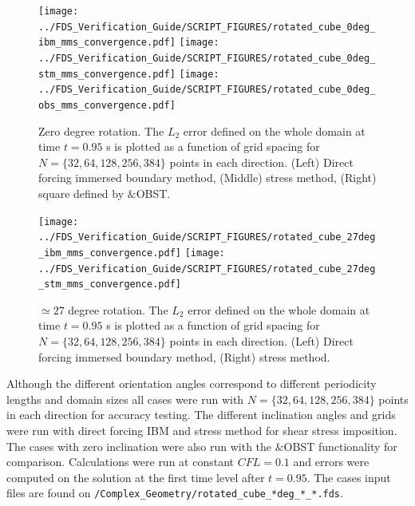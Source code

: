 \documentclass[11pt]{book}
\begin{document}
\begin{figure}[ht]
\centering
\texttt{[image: ../FDS\_Verification\_Guide/SCRIPT\_FIGURES/rotated\_cube\_0deg\_ibm\_mms\_convergence.pdf]}
\texttt{[image: ../FDS\_Verification\_Guide/SCRIPT\_FIGURES/rotated\_cube\_0deg\_stm\_mms\_convergence.pdf]}
\texttt{[image: ../FDS\_Verification\_Guide/SCRIPT\_FIGURES/rotated\_cube\_0deg\_obs\_mms\_convergence.pdf]}
\caption[The {\ct Rotated Cube CC} accuracy order test case]{Zero degree rotation. The $L_2$ error defined on the whole domain at time $t = 0.95$ s is plotted as a function of grid spacing for $N=\{32,64,128,256,384\}$ points in each direction. (Left) Direct forcing immersed boundary method, (Middle) stress method, (Right) square defined by $\&$OBST.}\label{fig:rotcube_cc_0deg_accuracy_order}
\end{figure}

\begin{figure}[ht]
\centering
\texttt{[image: ../FDS\_Verification\_Guide/SCRIPT\_FIGURES/rotated\_cube\_27deg\_ibm\_mms\_convergence.pdf]}
\texttt{[image: ../FDS\_Verification\_Guide/SCRIPT\_FIGURES/rotated\_cube\_27deg\_stm\_mms\_convergence.pdf]}
\caption[The {\ct Rotated Cube CC} accuracy order test case]{$\simeq27$ degree rotation. The $L_2$ error defined on the whole domain at time $t = 0.95$ s is plotted as a function of grid spacing for $N=\{32,64,128,256,384\}$ points in each direction. (Left) Direct forcing immersed boundary method, (Right) stress method.}\label{fig:rotcube_cc_27deg_accuracy_order}
\end{figure}

Although the different orientation angles correspond to different periodicity lengths and domain sizes all cases were run with $N=\{32,64,128,256,384\}$ points in each direction for accuracy testing. The different inclination angles and grids were run with direct forcing IBM and stress method for shear stress imposition. The cases with zero inclination were also run with the $\&$OBST functionality for comparison. Calculations were run at constant $CFL=0.1$ and errors were computed on the solution at the first time level after $t=0.95$. The cases input files are found on \texttt{/Complex\_Geometry/rotated\_cube\_*deg\_*\_*.fds}.
\end{document}
